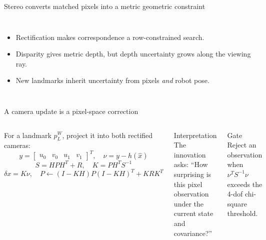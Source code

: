\documentclass[10pt,aspectratio=169]{beamer}
\begin{document}
\begin{frame}{Stereo converts matched pixels into a metric geometric constraint}
  \begin{columns}[T]
    \begin{itemize}
      \item Rectification makes correspondence a row-constrained search.
      \item Disparity gives metric depth, but depth uncertainty grows along the viewing ray.
      \item New landmarks inherit uncertainty from pixels \emph{and} robot pose.
    \end{itemize}
  \end{columns}
\end{frame}

\begin{frame}{A camera update is a pixel-space correction}
  \begin{columns}[T]
    For a landmark $p_L^W$, project it into both rectified cameras:
    \[
      y = \begin{bmatrix}u_0&v_0&u_1&v_1\end{bmatrix}^T,
      \quad \nu = y-h(\hat{x})
    \]
    \[
      S=HPH^T+R,\quad K=PH^TS^{-1}
    \]
    \[
      \delta x = K\nu,\quad P\leftarrow(I-KH)P(I-KH)^T+KRK^T
    \]
    \begin{block}{Interpretation}
      The innovation asks: ``How surprising is this pixel observation under the current state and covariance?''
    \end{block}
    \begin{alertblock}{Gate}
      Reject an observation when $\nu^TS^{-1}\nu$ exceeds the 4-dof chi-square threshold.
    \end{alertblock}
  \end{columns}
\end{frame}
\end{document}
